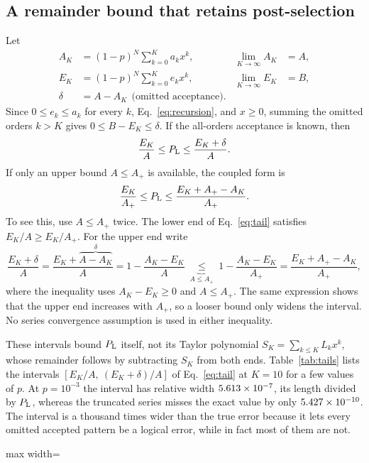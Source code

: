 \subsection{A remainder bound that retains post-selection}\label{app:F-tail}
Let
\begin{equation}
 \begin{aligned}
 A_K&=(1-p)^N\sum_{k=0}^K a_kx^k, & \lim_{K\to\infty}A_K&=A,\\
 E_K&=(1-p)^N\sum_{k=0}^K e_kx^k, & \lim_{K\to\infty}E_K&=B,\\
 \delta&=A-A_K\ \ \text{(omitted acceptance)}.
 \end{aligned}
 \label{eq:partialAE}
\end{equation}
Since $0\le e_k\le a_k$ for every $k$, Eq.~\eqref{eq:recursion}, and $x\ge0$, summing the omitted orders $k>K$ gives $0\le B-E_K\le\delta$. If the all-orders acceptance is known, then
\begin{equation}
 \frac{E_K}{A}\le P_{\mathrm L}\le\frac{E_K+\delta}{A}.
 \label{eq:tail}
\end{equation}
If only an upper bound $A\le A_+$ is available, the coupled form is
\begin{equation}
 \frac{E_K}{A_+}\le P_{\mathrm L}\le
                  \frac{E_K+A_+-A_K}{A_+}.
 \label{eq:tailupper}
\end{equation}
To see this, use $A\le A_+$ twice. The lower end of Eq.~\eqref{eq:tail} satisfies $E_K/A\ge E_K/A_+$. For the upper end write
\[
 \frac{E_K+\delta}{A}=\frac{E_K+\overbrace{A-A_K}^{\delta}}{A}=1-\frac{A_K-E_K}{A}\ \underbrace{\le}_{A\le A_+}\ 1-\frac{A_K-E_K}{A_+}=\frac{E_K+A_+-A_K}{A_+},
\]
where the inequality uses $A_K-E_K\ge0$ and $A\le A_+$. The same expression shows that the upper end increases with $A_+$, so a looser bound only widens the interval. No series convergence assumption is used in either inequality.

These intervals bound $\PL$ itself, not its Taylor polynomial $S_K=\sum_{k\le K}L_kx^k$, whose remainder follows by subtracting $S_K$ from both ends. Table~\ref{tab:tails} lists the intervals $[E_K/A,\ (E_K+\delta)/A]$ of Eq.~\eqref{eq:tail} at $K=10$ for a few values of $p$. At $p=10^{-3}$ the interval has relative width $5.613\times10^{-7}$, its length divided by $\PL$, whereas the truncated series misses the exact value by only $5.427\times10^{-10}$. The interval is a thousand times wider than the true error because it lets every omitted accepted pattern be a logical error, while in fact most of them are not.
{\color{black}
\begin{table}[H]\centering\small
\captionsetup{position=above,skip=4pt}
\caption{Tenth-order intervals of Eq.~\eqref{eq:tail} for $\PL$, endpoints rounded outward.}
\label{tab:tails}
\begin{adjustbox}{max width=\linewidth}\end{adjustbox}
\end{table}}
